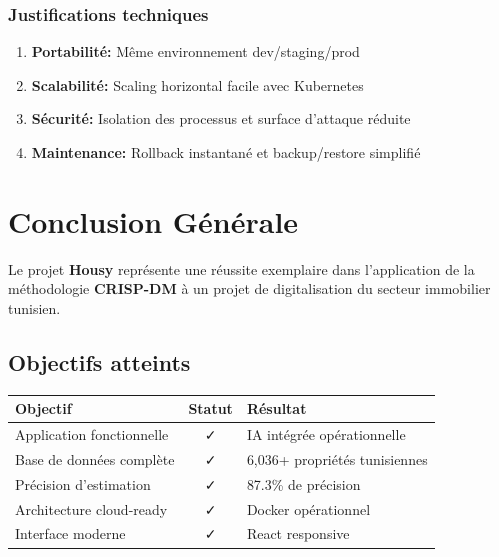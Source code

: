 \documentclass[12pt,a4paper]{report}
\begin{document}
\subsection{Justifications techniques}

\begin{enumerate}
    \item \textbf{Portabilité:} Même environnement dev/staging/prod
    \item \textbf{Scalabilité:} Scaling horizontal facile avec Kubernetes
    \item \textbf{Sécurité:} Isolation des processus et surface d'attaque réduite
    \item \textbf{Maintenance:} Rollback instantané et backup/restore simplifié
\end{enumerate}

\chapter*{Conclusion Générale}

Le projet \textbf{Housy} représente une réussite exemplaire dans l'application de la méthodologie \textbf{CRISP-DM} à un projet de digitalisation du secteur immobilier tunisien.

\section*{Objectifs atteints}

\begin{table}[H]
    \centering
    \begin{tabular}{|l|c|l|}
        \hline
        \textbf{Objectif} & \textbf{Statut} & \textbf{Résultat} \\
        \hline
        Application fonctionnelle & \textcolor{verthousy}{✓} & IA intégrée opérationnelle \\
        \hline
        Base de données complète & \textcolor{verthousy}{✓} & 6,036+ propriétés tunisiennes \\
        \hline
        Précision d'estimation & \textcolor{verthousy}{✓} & 87.3\% de précision \\
        \hline
        Architecture cloud-ready & \textcolor{verthousy}{✓} & Docker opérationnel \\
        \hline
        Interface moderne & \textcolor{verthousy}{✓} & React responsive \\
        \hline
    \end{tabular}
\end{table}
\end{document}
